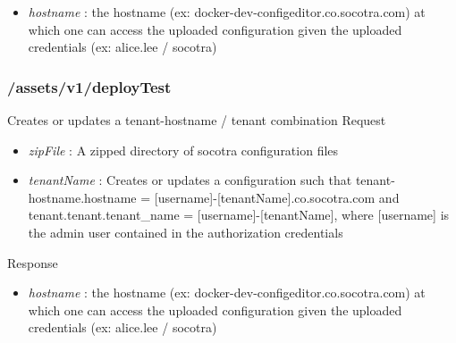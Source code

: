 \begin{itemize}
\tightlist
\item
  \emph{hostname} : the hostname (ex:
  docker-dev-configeditor.co.socotra.com) at which one can access the
  uploaded configuration given the uploaded credentials (ex: alice.lee /
  socotra)
\end{itemize}

\hypertarget{assetsv1deploytest}{%
\subsubsection{/assets/v1/deployTest}\label{assetsv1deploytest}}

Creates or updates a tenant-hostname / tenant combination Request

\begin{Shaded}
\begin{Highlighting}[]
\FunctionTok{\{}
    \FunctionTok{:} \FunctionTok{,}
    \FunctionTok{:} 
\FunctionTok{\}}
\end{Highlighting}
\end{Shaded}

\begin{itemize}
\tightlist
\item
  \emph{zipFile} : A zipped directory of socotra configuration files
\item
  \emph{tenantName} : Creates or updates a configuration such that
  tenant-hostname.hostname =
  {[}username{]}-{[}tenantName{]}.co.socotra.com and
  tenant.tenant.tenant\_name = {[}username{]}-{[}tenantName{]}, where
  {[}username{]} is the admin user contained in the authorization
  credentials
\end{itemize}

Response

\begin{Shaded}
\begin{Highlighting}[]
\FunctionTok{\{}
    \FunctionTok{:} \FunctionTok{,}
    \FunctionTok{:} \FunctionTok{,}
    \FunctionTok{:} 
\FunctionTok{\}}
\end{Highlighting}
\end{Shaded}

\begin{itemize}
\tightlist
\item
  \emph{hostname} : the hostname (ex:
  docker-dev-configeditor.co.socotra.com) at which one can access the
  uploaded configuration given the uploaded credentials (ex: alice.lee /
  socotra)
\end{itemize}

